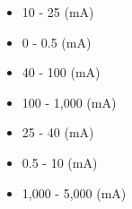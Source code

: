 \begin{minipage}{0.35\textwidth}
    \begin{itemize}
        \item[{\fillin[F][1cm]}] 10 - 25       (mA) \\[-1ex]
        \item[{\fillin[A][1cm]}] 0 - 0.5       (mA) \\[-1ex]
        \item[{\fillin[D][1cm]}] 40 - 100      (mA) \\[-1ex]
        \item[{\fillin[C][1cm]}] 100 - 1,000    (mA)\\[-1ex] 
        \item[{\fillin[E][1cm]}] 25 - 40       (mA) \\[-1ex]
        \item[{\fillin[G][1cm]}] 0.5 - 10      (mA) \\[-1ex]
        \item[{\fillin[B][1cm]}] 1,000 - 5,000 (mA) \\[-1ex]
    \end{itemize}
\end{minipage}